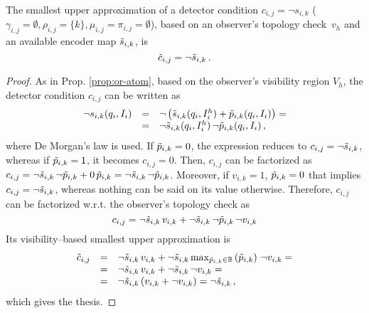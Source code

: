 \begin{proposition}
\label{prop:nor-atom}
The smallest upper approximation of a detector condition $c_{i,j}=\neg s_{i,k}$ ($\gamma_{i,j}=\emptyset, \rho_{i,j}=\{k\}, \mu_{i,j}=\pi_{i,j}=\emptyset$), based on an observer's topology check~$v_h$ and an available encoder map $\tilde{s}_{i,k}$, is
$$
\tilde{c}_{i,j} =  \neg \tilde{s}_{i,k} \, .
$$
\begin{proof}
As in Prop. \ref{prop:or-atom}, based on the observer's visibility region $V_h$, the detector condition $c_{i,j}$ can be written as  
\begin{equation*}
\begin{array}{rcl}
\neg s_{i,k}(q_i, I_i) & = & \neg \left( \tilde{s}_{i,k}(q_i, I_i^h) + \tilde{p}_{i,k}(q_i, I_i) \right) = \\
& = & \neg \tilde{s}_{i,k}(q_i, I_i^h) \, \neg \tilde{p}_{i,k}(q_i, I_i) \, ,
\end{array}
\end{equation*}
where De Morgan's law is used. If $\tilde{p}_{i,k} = 0$, the expression reduces to $c_{i,j} = \neg \tilde{s}_{i,k}$, whereas if $\tilde{p}_{i,k} = 1$, it becomes $c_{i,j} = 0$. Then, $c_{i,j}$ can be factorized as $c_{i,j} = \neg \tilde{s}_{i,k} \, \neg \tilde{p}_{i,k} + 0 \, \tilde{p}_{i,k} = \neg \tilde{s}_{i,k} \, \neg \tilde{p}_{i,k}$. Moreover, if $v_{i,k}=1$, $\tilde{p}_{i,k} = 0$ that implies $c_{i,j} = \neg \tilde{s}_{i,k}$, whereas nothing can be said on its value otherwise. Therefore, $c_{i,j}$ can be factorized w.r.t. the observer's topology check as
\begin{equation*}
c_{i,j} = \neg \tilde{s}_{i,k} \, v_{i,k} + \neg \tilde{s}_{i,k} \, \neg \tilde{p}_{i,k} \, \neg v_{i,k}
\end{equation*}
Its visibility--based smallest upper approximation is
\begin{equation*}
\begin{array}{rcl}
\tilde{c}_{i,j} & = & \neg \tilde{s}_{i,k} \, v_{i,k} + \neg \tilde{s}_{i,k} \max_{\tilde{p}_{i,k} \in \Bbb{B}} \left( \tilde{p}_{i,k} \right) \, \neg v_{i,k} = \\
& = & \neg \tilde{s}_{i,k} \, v_{i,k} + \neg \tilde{s}_{i,k} \, \neg v_{i,k} = \\
& = & \neg \tilde{s}_{i,k} \, (v_{i,k} + \neg v_{i,k}) = \neg \tilde{s}_{i,k} \, ,
\end{array}
\end{equation*}
which gives the thesis.
\end{proof}
\end{proposition}

